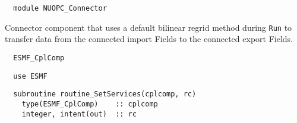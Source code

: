  
\setlength{\parskip}{0pt}
\setlength{\parindent}{0pt}
\setlength{\baselineskip}{11pt}
 
\def\bv{\begin{verbatim}}
\def\ev{\end{verbatim}}
\def\be{\begin{equation}}
\def\ee{\end{equation}}
\def\bea{\begin{eqnarray}}
\def\eea{\end{eqnarray}}
\def\bi{\begin{itemize}}
\def\ei{\end{itemize}}
\def\bn{\begin{enumerate}}
\def\en{\end{enumerate}}
\def\bd{\begin{description}}
\def\ed{\end{description}}
\def\({\left (}
\def\){\right )}
\def\[{\left [}
\def\]{\right ]}
\def\<{\left  \langle}
\def\>{\right \rangle}
\def\cI{{\cal I}}
\def\diag{\mathop{\rm diag}}
\def\tr{\mathop{\rm tr}}


\begin{verbatim}  module NUOPC_Connector
\end{verbatim}

Connector component that uses a default bilinear regrid method during {\tt Run} to transfer data from the connected import Fields to the connected export Fields.

\begin{verbatim}  ESMF_CplComp
\end{verbatim}

\begin{verbatim}  use ESMF
\end{verbatim}

\begin{verbatim}  subroutine routine_SetServices(cplcomp, rc)
    type(ESMF_CplComp)    :: cplcomp
    integer, intent(out)  :: rc
\end{verbatim}

